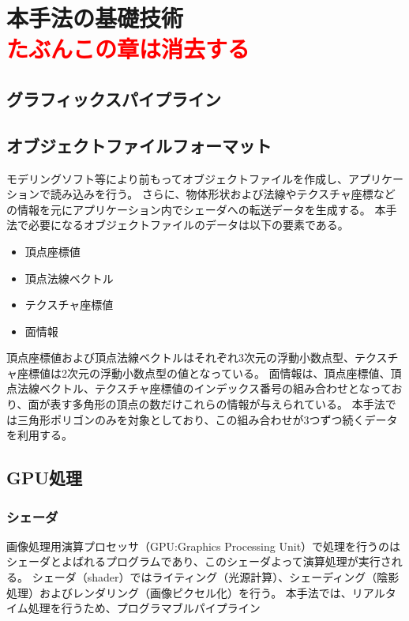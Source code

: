 \chapter{本手法の基礎技術\\ \textcolor{red}{ たぶんこの章は消去する}}
\label{CBasicmethod}



\section{グラフィックスパイプライン}
\label{SGraphicspipeline}

\section{オブジェクトファイルフォーマット}
\label{SObjfileformat}

モデリングソフト等により前もってオブジェクトファイルを作成し、アプリケーションで読み込みを行う。
さらに、物体形状および法線やテクスチャ座標などの情報を元にアプリケーション内でシェーダへの転送データを生成する。
本手法で必要になるオブジェクトファイルのデータは以下の要素である。

\begin{itemize}
\item 頂点座標値
\item 頂点法線ベクトル
\item テクスチャ座標値
\item 面情報
\end{itemize}

頂点座標値および頂点法線ベクトルはそれぞれ3次元の浮動小数点型、テクスチャ座標値は2次元の浮動小数点型の値となっている。
面情報は、頂点座標値、頂点法線ベクトル、テクスチャ座標値のインデックス番号の組み合わせとなっており、面が表す多角形の頂点の数だけこれらの情報が与えられている。
本手法では三角形ポリゴンのみを対象としており、この組み合わせが3つずつ続くデータを利用する。

\section{GPU処理}
\label{SGpumethod}

\subsection{シェーダ}
\label{SSShader}
画像処理用演算プロセッサ（GPU:Graphics Processing Unit）で処理を行うのはシェーダとよばれるプログラムであり、このシェーダよって演算処理が実行される。
シェーダ（shader）ではライティング（光源計算）、シェーディング（陰影処理）およびレンダリング（画像ピクセル化）を行う。
本手法では、リアルタイム処理を行うため、プログラマブルパイプライン
